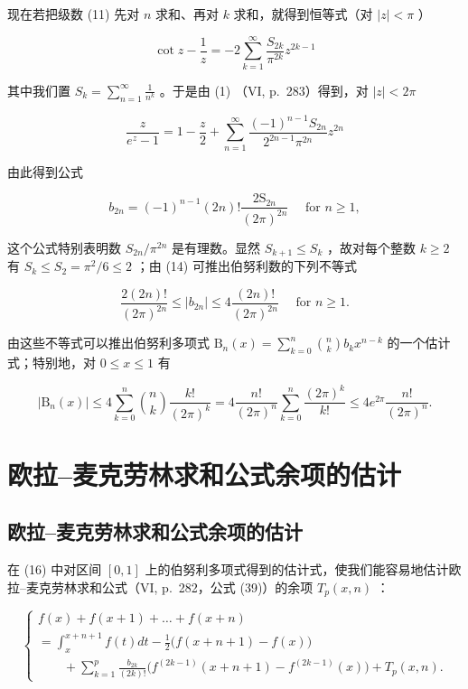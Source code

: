 现在若把级数 (11) 先对 \(n\) 求和、再对 \(k\) 求和，就得到恒等式（对 \(|z| < \pi\) ）

\[
\cot z - \frac {1}{z} = - 2 \sum_ {k = 1} ^ {\infty} \frac {S _ {2 k}}{\pi^ {2 k}} z ^ {2 k - 1}\tag{12}
\]

其中我们置 \(S_{k} = \sum_{n=1}^{\infty} \frac{1}{n^{k}}\) 。于是由 (1) （VI, p.~283）得到，对 \(|z| < 2\pi\)

\[
\frac {z}{e ^ {z} - 1} = 1 - \frac {z}{2} + \sum_ {n = 1} ^ {\infty} \frac {(- 1) ^ {n - 1} S _ {2 n}}{2 ^ {2 n - 1} \pi^ {2 n}} z ^ {2 n}\tag{13}
\]

由此得到公式

\[
b _ {2 n} = (- 1) ^ {n - 1} (2 n)! \frac {2 \mathrm{S} _ {2 n}}{(2 \pi) ^ {2 n}} \quad \text {   for   } n \geqslant 1,\tag{14}
\]

这个公式特别表明数 \(S_{2n} / \pi^{2n}\) 是有理数。显然 \(S_{k + 1} \leqslant S_k\) ，故对每个整数 \(k \geqslant 2\) 有 \(S_k \leqslant S_2 = \pi^2 / 6 \leqslant 2\) ；由 (14) 可推出伯努利数的下列不等式

\[
\frac {2 (2 n) !}{(2 \pi) ^ {2 n}} \leqslant | b _ {2 n} | \leqslant 4 \frac {(2 n) !}{(2 \pi) ^ {2 n}} \quad \text {   for   } n \geqslant 1.\tag{15}
\]

由这些不等式可以推出伯努利多项式 \(\mathrm{B}_n(x) = \sum_{k=0}^{n}\binom{n}{k}b_kx^{n - k}\) 的一个估计式；特别地，对 \(0 \leqslant x \leqslant 1\) 有

\[
\left| \mathrm{B} _ {n} (x) \right| \leqslant 4 \sum_ {k = 0} ^ {n} \binom {n} {k} \frac {k !}{(2 \pi) ^ {k}} = 4 \frac {n !}{(2 \pi) ^ {n}} \sum_ {k = 0} ^ {n} \frac {(2 \pi) ^ {k}}{k !} \leqslant 4 e ^ {2 \pi} \frac {n !}{(2 \pi) ^ {n}}.\tag{16}
\]

\section{欧拉–麦克劳林求和公式余项的估计}

\subsection{欧拉–麦克劳林求和公式余项的估计}

在 (16) 中对区间 \([0, 1]\) 上的伯努利多项式得到的估计式，使我们能容易地估计欧拉–麦克劳林求和公式（VI, p.~282，公式 (39)）的余项 \(T_{p}(x, n)\) ：

\[
\left\{ \begin{array}{l} f (x) + f (x + 1) + \dots + f (x + n) \\ = \int_ {x} ^ {x + n + 1} f (t) d t - \frac {1}{2} \bigl (f (x + n + 1) - f (x) \bigr) \\ \qquad + \sum_ {k = 1} ^ {p} \frac {b _ {2 k}}{(2 k) !} \bigl (f ^ {(2 k - 1)} (x + n + 1) - f ^ {(2 k - 1)} (x) \bigr) + T _ {p} (x, n). \end{array} \right.\tag{1}
\]

